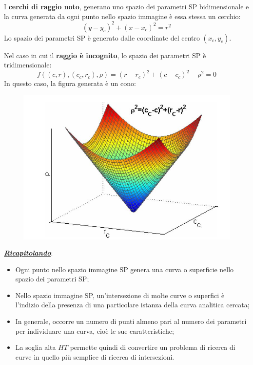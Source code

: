 \documentclass[a4paper]{article}
\begin{document}
	\noindent
	I \textbf{cerchi di raggio noto}, generano uno spazio dei parametri SP bidimensionale e la curva generata da ogni punto nello spazio immagine è essa stessa un cerchio:
	\begin{equation*}
		\left(y-y_{c}\right)^{2} + \left(x-x_{c}\right)^{2} = r^{2}
	\end{equation*}
	Lo spazio dei parametri SP è generato dalle coordinate del centro $\left(x_{c},y_{c}\right)$.\newline
	
	\noindent
	Nel caso in cui il \textbf{raggio è incognito}, lo spazio dei parametri SP è tridimensionale:
	\begin{equation*}
		f\left(\left(c,r\right), \left(c_{c},r_{c}\right), \rho\right) = \left(r-r_{c}\right)^{2} + \left(c-c_{c}\right)^{2} - \rho^{2} = 0
	\end{equation*}
	In questo caso, la figura generata è un cono:
	\begin{figure}[!htp]
		\centering
		\includegraphics[width=.7\textwidth]{img/cono.png}
	\end{figure}
	
	\noindent
	\textbf{\underline{\emph{Ricapitolando}}}:
	\begin{itemize}[label=]
		\item Ogni punto nello spazio immagine SP genera una curva o superficie nello spazio dei parametri SP;
		
		\item Nello spazio immagine SP, un'intersezione di molte curve o superfici è l'indizio della presenza di una particolare istanza della curva analitica cercata;
		
		\item In generale, occorre un numero di punti almeno pari al numero dei parametri per individuare una curva, cioè le sue caratteristiche;
		
		\item La soglia alta $HT$ permette quindi di convertire un problema di ricerca di curve in quello più semplice di ricerca di intersezioni.
	\end{itemize}\newpage
\end{document}
